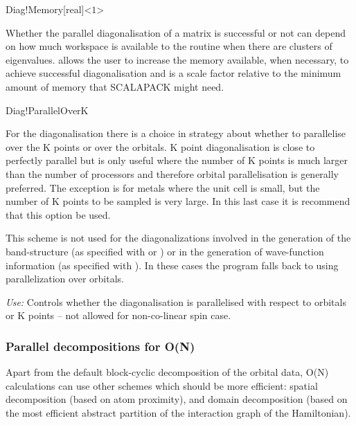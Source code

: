 \begin{fdfentry}{Diag!Memory}[real]<$1$>
  
  Whether the parallel diagonalisation of a matrix is successful or
  not can depend on how much workspace is available to the routine
  when there are clusters of eigenvalues.  allows
  the user to increase the memory available, when necessary, to
  achieve successful diagonalisation and is a scale factor relative to
  the minimum amount of memory that SCALAPACK might need.

\end{fdfentry}


\begin{fdflogicalF}{Diag!ParallelOverK}
  
  For the diagonalisation there is a choice in strategy about whether
  to parallelise over the K points or over the orbitals. K point
  diagonalisation is close to perfectly parallel but is only useful
  where the number of K points is much larger than the number of
  processors and therefore orbital parallelisation is generally
  preferred. The exception is for metals where the unit cell is small,
  but the number of K points to be sampled is very large. In this last
  case it is recommend that this option be used.

  \note This scheme is not used for the diagonalizations involved in
  the generation of the band-structure (as specified with
   or ) or in the generation of
  wave-function information (as specified with
  ). In these cases the program falls back to
  using parallelization over orbitals.

  \emph{Use:} Controls whether the diagonalisation is parallelised
  with respect to orbitals or K points -- not allowed for
  non-co-linear spin case.

\end{fdflogicalF}


\subsubsection{Parallel decompositions for O(N)}
\label{parallel-on}

Apart from the default block-cyclic decomposition of the orbital data,
O(N) calculations can use other schemes which should be more
efficient: spatial decomposition (based on atom proximity), and domain
decomposition (based on the most efficient abstract partition of the
interaction graph of the Hamiltonian). 


